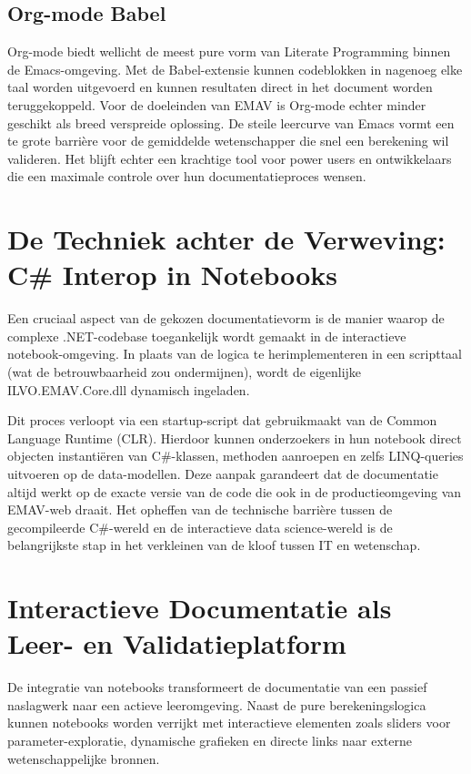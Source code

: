 \subsection{Org-mode Babel}
Org-mode \autocite{orgmode2025} biedt wellicht de meest pure vorm van Literate Programming binnen de Emacs-omgeving. Met de Babel-extensie kunnen codeblokken in nagenoeg elke taal worden uitgevoerd en kunnen resultaten direct in het document worden teruggekoppeld. Voor de doeleinden van EMAV is Org-mode echter minder geschikt als breed verspreide oplossing. De steile leercurve van Emacs vormt een te grote barrière voor de gemiddelde wetenschapper die snel een berekening wil valideren. Het blijft echter een krachtige tool voor power users en ontwikkelaars die een maximale controle over hun documentatieproces wensen.

\section{De Techniek achter de Verweving: C\# Interop in Notebooks}
Een cruciaal aspect van de gekozen documentatievorm is de manier waarop de complexe .NET-codebase toegankelijk wordt gemaakt in de interactieve notebook-omgeving. In plaats van de logica te herimplementeren in een scripttaal (wat de betrouwbaarheid zou ondermijnen), wordt de eigenlijke ILVO.EMAV.Core.dll dynamisch ingeladen.

Dit proces verloopt via een startup-script dat gebruikmaakt van de Common Language Runtime (CLR). Hierdoor kunnen onderzoekers in hun notebook direct objecten instantiëren van C\#-klassen, methoden aanroepen en zelfs LINQ-queries uitvoeren op de data-modellen. Deze aanpak garandeert dat de documentatie altijd werkt op de exacte versie van de code die ook in de productieomgeving van EMAV-web draait. Het opheffen van de technische barrière tussen de gecompileerde C\#-wereld en de interactieve data science-wereld is de belangrijkste stap in het verkleinen van de kloof tussen IT en wetenschap.

\section{Interactieve Documentatie als Leer- en Validatieplatform}
{\sloppy De integratie van notebooks transformeert de documentatie van een passief naslagwerk naar een actieve leeromgeving. Naast de pure berekeningslogica kunnen notebooks worden verrijkt met interactieve elementen zoals sliders voor parameter-exploratie, dynamische grafieken en directe links naar externe wetenschappelijke bronnen.\par}

